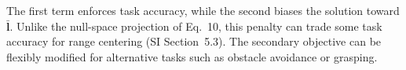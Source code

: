 The first term enforces task accuracy, while the second biases the solution toward $\bar{\mathbf{l}}$. Unlike the null-space projection of Eq.~10, this penalty can trade some task accuracy for range centering (SI Section~5.3). The secondary objective can be flexibly modified for alternative tasks such as obstacle avoidance or grasping.
